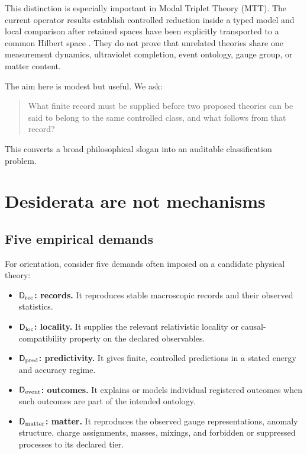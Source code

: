 \documentclass[11pt]{article}
\theoremstyle{definition}
\theoremstyle{remark}
\newcommand{\axis}[1]{\mathsf{#1}}
\begin{document}
This distinction is especially important in Modal Triplet Theory (MTT).
The current operator results establish controlled reduction inside a typed
model and local comparison after retained spaces have been explicitly
transported to a common Hilbert space
\cite{NeroCoherentReduction2026,NeroLocalRobustness2026}. They do not prove that
unrelated theories share one measurement dynamics, ultraviolet completion,
event ontology, gauge group, or matter content.

The aim here is modest but useful. We ask:
\begin{quote}
What finite record must be supplied before two proposed theories can be said to
belong to the same controlled class, and what follows from that record?
\end{quote}
This converts a broad philosophical slogan into an auditable classification
problem.

\section{Desiderata are not mechanisms}
\label{sec:desiderata}

\subsection{Five empirical demands}

For orientation, consider five demands often imposed on a candidate physical
theory:
\begin{itemize}[leftmargin=1.5em]
  \item \textbf{\(\axis{D}_{\rm rec}\): records.}
  It reproduces stable macroscopic records and their observed statistics.

  \item \textbf{\(\axis{D}_{\rm loc}\): locality.}
  It supplies the relevant relativistic locality or causal-compatibility
  property on the declared observables.

  \item \textbf{\(\axis{D}_{\rm pred}\): predictivity.}
  It gives finite, controlled predictions in a stated energy and accuracy
  regime.

  \item \textbf{\(\axis{D}_{\rm event}\): outcomes.}
  It explains or models individual registered outcomes when such outcomes are
  part of the intended ontology.

  \item \textbf{\(\axis{D}_{\rm matter}\): matter.}
  It reproduces the observed gauge representations, anomaly structure, charge
  assignments, masses, mixings, and forbidden or suppressed processes to its
  declared tier.
\end{itemize}
\end{document}
